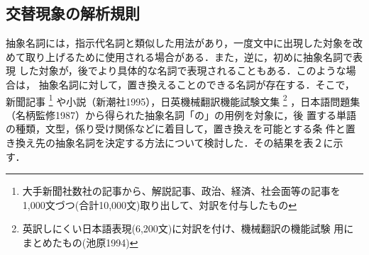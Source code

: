 \subsection{交替現象の解析規則}

抽象名詞には，指示代名詞と類似した用法があり，一度文中に出現した対象を改
めて取り上げるために使用される場合がある．また，逆に，初めに抽象名詞で表現
した対象が，後でより具体的な名詞で表現されることもある．このような場合は，
抽象名詞に対して，置き換えることのできる名詞が存在する．そこで，新聞記事
\footnote{大手新聞社数社の記事から、解説記事、政治、経済、社会面等の記事を
1,000文づつ(合計10,000文)取り出して、対訳を付与したもの}
や小説（新潮社1995），日英機械翻訳機能試験文集
\footnote{英訳しにくい日本語表現(6,200文)に対訳を付け、機械翻訳の機能試験
用にまとめたもの(池原1994)}
，日本語問題集（名柄監修1987）から得られた抽象名詞「の」の用例を対象に，後
置する単語の種類，文型，係り受け関係などに着目して，置き換えを可能とする条
件と置き換え先の抽象名詞を決定する方法について検討した．その結果を表２に示
す．

